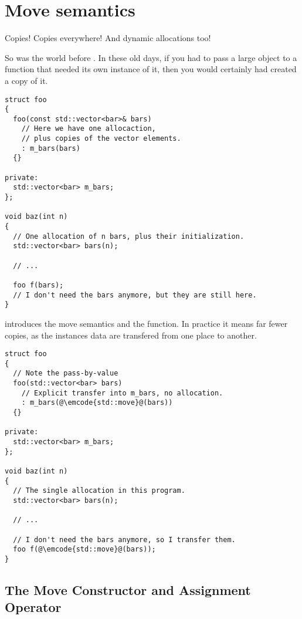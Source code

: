 \section{Move semantics}
\label{move}

Copies! Copies everywhere! And dynamic allocations too!

So was the world before . In these old days, if you had to pass
a large object to a function that needed its own instance of it, then
you would certainly had created a copy of it.

\begin{lstlisting}
struct foo
{
  foo(const std::vector<bar>& bars)
    // Here we have one allocaction,
    // plus copies of the vector elements.
    : m_bars(bars)
  {}

private:
  std::vector<bar> m_bars;
};

void baz(int n)
{
  // One allocation of n bars, plus their initialization.
  std::vector<bar> bars(n);

  // ...

  foo f(bars);
  // I don't need the bars anymore, but they are still here.
}
\end{lstlisting}

 introduces the move semantics and the 
function. In practice it means far fewer copies, as the instances data
are transfered from one place to another.

\begin{lstlisting}
struct foo
{
  // Note the pass-by-value
  foo(std::vector<bar> bars)
    // Explicit transfer into m_bars, no allocation.
    : m_bars(@\emcode{std::move}@(bars))
  {}

private:
  std::vector<bar> m_bars;
};

void baz(int n)
{
  // The single allocation in this program.
  std::vector<bar> bars(n);

  // ...

  // I don't need the bars anymore, so I transfer them.
  foo f(@\emcode{std::move}@(bars));
}
\end{lstlisting}

\subsection{The Move Constructor and Assignment Operator}

